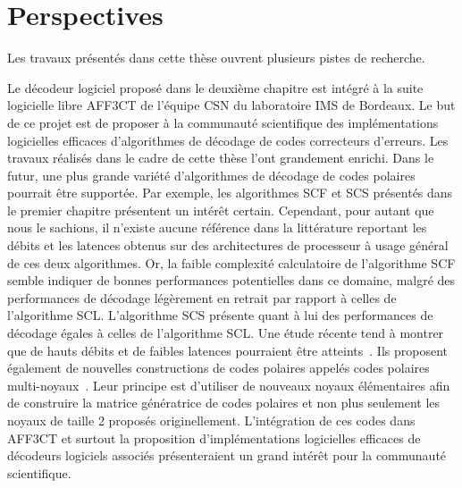 \section*{Perspectives}

Les travaux présentés dans cette thèse ouvrent plusieurs pistes de recherche. 

Le décodeur logiciel proposé dans le deuxième chapitre est intégré à la suite logicielle libre AFF3CT de l'équipe CSN du laboratoire IMS de Bordeaux. Le but de ce projet est de proposer à la communauté scientifique des implémentations logicielles efficaces d'algorithmes de décodage de codes correcteurs d'erreurs. Les travaux réalisés dans le cadre de cette thèse l'ont grandement enrichi. Dans le futur, une plus grande variété d'algorithmes de décodage de codes polaires pourrait être supportée. Par exemple, les algorithmes SCF et SCS présentés dans le premier chapitre présentent un intérêt certain. Cependant, pour autant que nous le sachions, il n'existe aucune référence dans la littérature reportant les débits et les latences obtenus sur des architectures de processeur à usage général de ces deux algorithmes. Or, la faible complexité calculatoire de l'algorithme SCF semble indiquer de bonnes performances potentielles dans ce domaine, malgré des performances de décodage légèrement en retrait par rapport à celles de l'algorithme SCL. L'algorithme SCS présente quant à lui des performances de décodage égales à celles de l'algorithme SCL. Une étude récente tend à montrer que de hauts débits et de faibles latences pourraient être atteints~\cite{8351832}. Ils proposent également de nouvelles constructions de codes polaires appelés codes polaires multi-noyaux~\cite{7962750,8254147}. Leur principe est d'utiliser de nouveaux noyaux élémentaires afin de construire la matrice génératrice de codes polaires et non plus seulement les noyaux de taille 2 proposés originellement. L'intégration de ces codes dans AFF3CT et surtout la proposition d'implémentations logicielles efficaces de décodeurs logiciels associés présenteraient un grand intérêt pour la communauté scientifique.

